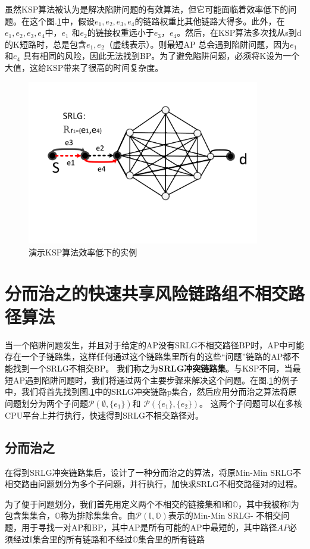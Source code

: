 虽然KSP算法被认为是解决陷阱问题的有效算法，但它可能面临着效率低下的问题。在这个图.\ref{fig:KSPproblem}中，假设$e_1, e_2, e_3, e_4$的链路权重比其他链路大得多。此外，在$e_1, e_2, e_3, e_4$中，$e_1$ 和$e_2$的链接权重远小于$e_3$，$e_4$。然后，在KSP算法多次找从s到d的K短路时，总是包含$e_1,e_2$（虚线表示）。则最短AP 总会遇到陷阱问题，因为$e_1$和$e_4$ 具有相同的风险，因此无法找到BP。为了避免陷阱问题，必须将K设为一个大值，这给KSP带来了很高的时间复杂度。
\begin{figure}[htbp]
\centering
\includegraphics[width=4.0in]{figures/KSPproblem}
  \caption{演示KSP算法效率低下的实例}
  \label{fig:KSPproblem}
\end{figure}


\section{分而治之的快速共享风险链路组不相交路径算法}
当一个陷阱问题发生，并且对于给定的AP没有SRLG不相交路径BP时，AP中可能存在一个子链路集，这样任何通过这个链路集里所有的这些“问题”链路的AP都不能找到一个SRLG不相交BP。 我们称之为\textbf{SRLG冲突链路集}。与KSP不同，当最短AP遇到陷阱问题时，我们将通过两个主要步骤来解决这个问题。在图.\ref{fig:KSPproblem}的例子中，我们将首先找到图.\ref{fig:KSPproblem}中的SRLG冲突链路p集合，然后应用分而治之算法将原问题划分为两个子问题$\mathcal{P}(\emptyset,\{e_1\})$和 $\mathcal{P}(\{e_1\},\{e_2\})$。 这两个子问题可以在多核CPU平台上并行执行，快速得到SRLG不相交路径对。
\subsection{分而治之}
在得到SRLG冲突链路集后，设计了一种分而治之的算法，将原Min-Min SRLG不相交路由问题划分为多个子问题，并行执行，加快求SRLG不相交路径对的过程。

为了便于问题划分，我们首先用定义两个不相交的链接集和$\mathbb{I}$和$\mathbb{O}$，其中我被称$\mathbb{I}$为包含集集合，$\mathbb{O}$称为排除集集合。由$\mathcal{P}({\mathbb{I},\mathbb{O}})$表示的Min-Min SRLG- 不相交问题，用于寻找一对AP和BP，其中AP是所有可能的AP中最短的，其中路径$AP$必须经过$\mathbb{I}$集合里的所有链路和不经过$\mathbb{O}$集合里的所有链路

